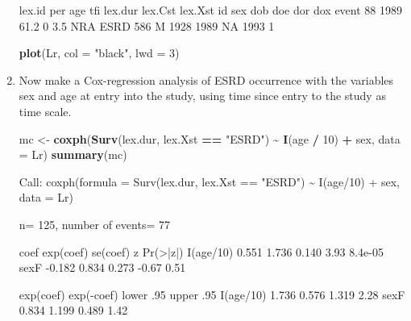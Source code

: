 \documentclass[
]{book}
\newenvironment{Shaded}{\begin{snugshade}}{\end{snugshade}}
\newcommand{\AttributeTok}[1]{\textcolor[rgb]{0.13,0.29,0.53}{#1}}
\newcommand{\DecValTok}[1]{\textcolor[rgb]{0.00,0.00,0.81}{#1}}
\newcommand{\FunctionTok}[1]{\textcolor[rgb]{0.13,0.29,0.53}{\textbf{#1}}}
\newcommand{\NormalTok}[1]{#1}
\newcommand{\OtherTok}[1]{\textcolor[rgb]{0.56,0.35,0.01}{#1}}
\newcommand{\SpecialCharTok}[1]{\textcolor[rgb]{0.81,0.36,0.00}{\textbf{#1}}}
\newcommand{\StringTok}[1]{\textcolor[rgb]{0.31,0.60,0.02}{#1}}
\begin{document}
\begin{enumerate}
\begin{Shaded}
\begin{Highlighting}[]
\NormalTok{ lex.id  per  age tfi lex.dur lex.Cst lex.Xst  id sex  dob  doe dor  dox event}
\NormalTok{     88 1989 61.2   0     3.5     NRA    ESRD 586   M 1928 1989  NA 1993     1}
\end{Highlighting}
\end{Shaded}

\begin{Shaded}
\begin{Highlighting}[]
\FunctionTok{plot}\NormalTok{(Lr, }\AttributeTok{col =} \StringTok{"black"}\NormalTok{, }\AttributeTok{lwd =} \DecValTok{3}\NormalTok{)}
\end{Highlighting}
\end{Shaded}
\item
  Now make a Cox-regression analysis of ESRD occurrence with
  the variables sex and age at entry into the study, using time
  since entry to the study as time scale.

\begin{Shaded}
\begin{Highlighting}[]
\NormalTok{mc }\OtherTok{\textless{}{-}} \FunctionTok{coxph}\NormalTok{(}\FunctionTok{Surv}\NormalTok{(lex.dur, lex.Xst }\SpecialCharTok{==} \StringTok{"ESRD"}\NormalTok{) }
            \SpecialCharTok{\textasciitilde{}} \FunctionTok{I}\NormalTok{(age }\SpecialCharTok{/} \DecValTok{10}\NormalTok{) }\SpecialCharTok{+}\NormalTok{ sex, }\AttributeTok{data =}\NormalTok{ Lr)}
\FunctionTok{summary}\NormalTok{(mc)}
\end{Highlighting}
\end{Shaded}

\begin{Shaded}
\begin{Highlighting}[]
\NormalTok{Call:}
\NormalTok{coxph(formula = Surv(lex.dur, lex.Xst == "ESRD") \textasciitilde{} I(age/10) + }
\NormalTok{    sex, data = Lr)}

\NormalTok{  n= 125, number of events= 77 }

\NormalTok{            coef exp(coef) se(coef)     z Pr(\textgreater{}|z|)}
\NormalTok{I(age/10)  0.551     1.736    0.140  3.93  8.4e{-}05}
\NormalTok{sexF      {-}0.182     0.834    0.273 {-}0.67     0.51}

\NormalTok{          exp(coef) exp({-}coef) lower .95 upper .95}
\NormalTok{I(age/10)     1.736      0.576     1.319      2.28}
\NormalTok{sexF          0.834      1.199     0.489      1.42}


\end{Highlighting}
\end{Shaded}
\end{enumerate}
\end{document}
